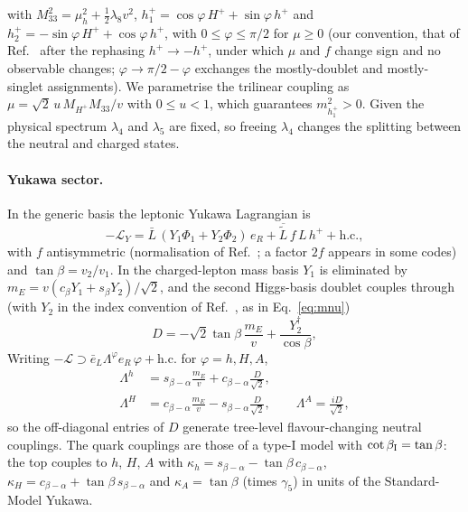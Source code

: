 \documentclass[twocolumn,epjc3]{svjour3}
\newcommand{\HG}{Ref.~\cite{HerreroGarcia:2017xdq}}
\begin{document}
with $M_{33}^2=\mu_h^2+\tfrac12\lambda_8v^2$, $h_1^+=\cos\varphi\,H^++\sin\varphi\,h^+$ and $h_2^+=-\sin\varphi\,H^++\cos\varphi\,h^+$, with $0\le\varphi\le\pi/2$ for $\mu\ge0$ (our convention, that of \HG{} after the rephasing $h^+\to-h^+$, under which $\mu$ and $f$ change sign and no observable changes; $\varphi\to\pi/2-\varphi$ exchanges the mostly-doublet and mostly-singlet assignments). We parametrise the trilinear coupling as $\mu=\sqrt2\,u\,M_{H^+}M_{33}/v$ with $0\le u<1$, which guarantees $m^2_{h_1^+}>0$. Given the physical spectrum $\lambda_4$ and $\lambda_5$ are fixed, so freeing $\lambda_4$ changes the splitting between the neutral and charged states.

\paragraph{Yukawa sector.} In the generic basis the leptonic Yukawa Lagrangian is
\begin{equation}
-\mathcal L_Y=\bar L\,(Y_1\Phi_1+Y_2\Phi_2)\,e_R+\overline{\tilde L}\,f\,L\,h^++\text{h.c.},
\end{equation}
with $f$ antisymmetric (normalisation of \HG{}; a factor $2f$ appears in some codes) and $\tan\beta=v_2/v_1$. In the charged-lepton mass basis $Y_1$ is eliminated by $m_E=v(c_\beta Y_1+s_\beta Y_2)/\sqrt2$, and the second Higgs-basis doublet couples through (with $Y_2$ in the index convention of \HG{}, as in Eq.~\eqref{eq:mnu})
\begin{equation}
D=-\sqrt2\tan\beta\,\frac{m_E}{v}+\frac{Y_2^\dagger}{\cos\beta},
\end{equation}
Writing $-\mathcal L\supset\bar e_L\Lambda^\varphi e_R\,\varphi+\text{h.c.}$ for $\varphi=h,H,A$,
\begin{align}
\Lambda^h&=s_{\beta-\alpha}\frac{m_E}{v}+c_{\beta-\alpha}\frac{D}{\sqrt2},\nonumber\\
\Lambda^H&=c_{\beta-\alpha}\frac{m_E}{v}-s_{\beta-\alpha}\frac{D}{\sqrt2},\qquad
\Lambda^A=\frac{iD}{\sqrt2},
\label{eq:lambdas}
\end{align}
so the off-diagonal entries of $D$ generate tree-level flavour-changing neutral couplings. The quark couplings are those of a type-I model with $\cot\beta_{\rm I}=\tan\beta$: the top couples to $h$, $H$, $A$ with $\kappa_h=s_{\beta-\alpha}-\tan\beta\,c_{\beta-\alpha}$, $\kappa_H=c_{\beta-\alpha}+\tan\beta\,s_{\beta-\alpha}$ and $\kappa_A=\tan\beta$ (times $\gamma_5$) in units of the Standard-Model Yukawa.
\end{document}
